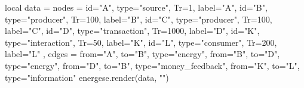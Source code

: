 \documentclass{standalone}
\begin{document}
\begin{luacode*}
    local data = {
        nodes = {
            {id="A", type="source", Tr=1, label="A"},
            {id="B", type="producer", Tr=100, label="B"},
            {id="C", type="producer", Tr=100, label="C"},
            {id="D", type="transaction", Tr=1000, label="D"},
            {id="K", type="interaction", Tr=50, label="K"},
            {id="L", type="consumer", Tr=200, label="L"}
        },
        edges = {
            {from="A", to="B", type="energy"},
            {from="B", to="D", type="energy"},
            {from="D", to="B", type="money_feedback"},
            {from="K", to="L", type="information"}
        }
    }
    energese.render(data, "")
\end{luacode*}
\end{document}
